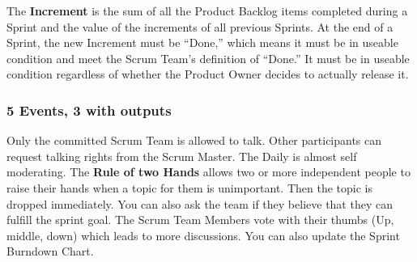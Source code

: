 The \textbf{Increment} is the sum of all the Product Backlog items completed during a Sprint and the value of the increments of all previous Sprints. At the end of a Sprint, the new Increment must be “Done,” which means it must be in useable condition and meet the Scrum Team’s definition of “Done.” It must be in useable condition regardless of whether the Product Owner decides to actually release it.

\subsubsection{5 Events, 3 with outputs}

\newline\newline Only the committed Scrum Team is allowed to talk. Other participants can request talking rights from the Scrum Master. The Daily is almost self moderating. The \textbf{Rule of two Hands} allows two or more independent people to raise their hands when a topic for them is unimportant. Then the topic is dropped immediately. You can also ask the team if they believe that they can fulfill the sprint goal. The Scrum Team Members vote with their thumbs (Up, middle, down) which leads to more discussions. You can also update the Sprint Burndown Chart.\newline

